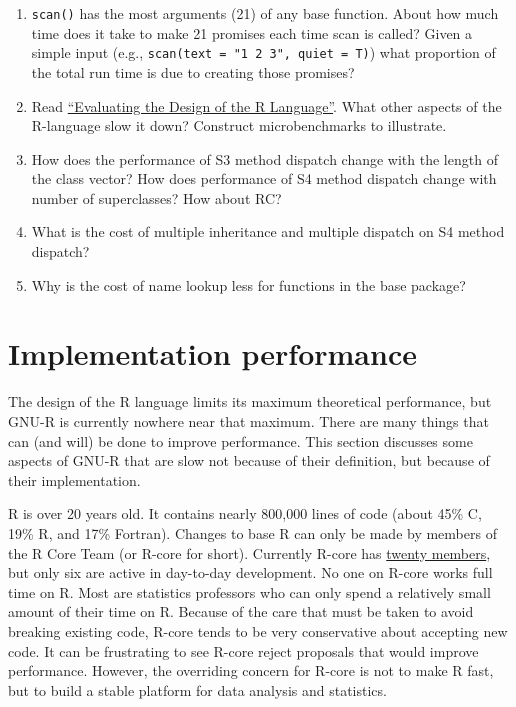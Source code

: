 \begin{enumerate}
\def\labelenumi{\arabic{enumi}.}
\item
  \texttt{scan()} has the most arguments (21) of any base function.
  About how much time does it take to make 21 promises each time scan is
  called? Given a simple input (e.g.,
  \texttt{scan(text\ =\ "1\ 2\ 3",\ quiet\ =\ T)}) what proportion of
  the total run time is due to creating those promises?
\item
  Read \href{http://r.cs.purdue.edu/pub/ecoop12.pdf}{``Evaluating the
  Design of the R Language''}. What other aspects of the R-language slow
  it down? Construct microbenchmarks to illustrate.
\item
  How does the performance of S3 method dispatch change with the length
  of the class vector? How does performance of S4 method dispatch change
  with number of superclasses? How about RC?
\item
  What is the cost of multiple inheritance and multiple dispatch on S4
  method dispatch?
\item
  Why is the cost of name lookup less for functions in the base package?
\end{enumerate}

\hypertarget{implementation-performance}{%
\section{Implementation performance}\label{implementation-performance}}

The design of the R language limits its maximum theoretical performance,
but GNU-R is currently nowhere near that maximum. There are many things
that can (and will) be done to improve performance. This section
discusses some aspects of GNU-R that are slow not because of their
definition, but because of their implementation.

R is over 20 years old. It contains nearly 800,000 lines of code (about
45\% C, 19\% R, and 17\% Fortran). Changes to base R can only be made by
members of the R Core Team (or R-core for short). Currently R-core has
\href{http://www.r-project.org/contributors.html}{twenty members}, but
only six are active in day-to-day development. No one on R-core works
full time on R. Most are statistics professors who can only spend a
relatively small amount of their time on R. Because of the care that
must be taken to avoid breaking existing code, R-core tends to be very
conservative about accepting new code. It can be frustrating to see
R-core reject proposals that would improve performance. However, the
overriding concern for R-core is not to make R fast, but to build a
stable platform for data analysis and statistics. 

